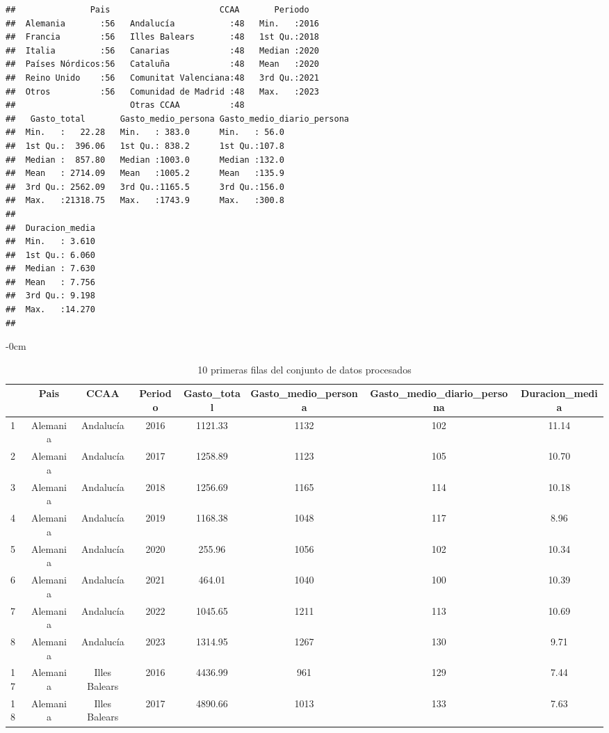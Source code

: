 \documentclass[data,article,submit,moreauthors,pdftex]{Definitions/mdpi}
\begin{document}
\begin{verbatim}
##               Pais                      CCAA       Periodo    
##  Alemania       :56   Andalucía           :48   Min.   :2016  
##  Francia        :56   Illes Balears       :48   1st Qu.:2018  
##  Italia         :56   Canarias            :48   Median :2020  
##  Países Nórdicos:56   Cataluña            :48   Mean   :2020  
##  Reino Unido    :56   Comunitat Valenciana:48   3rd Qu.:2021  
##  Otros          :56   Comunidad de Madrid :48   Max.   :2023  
##                       Otras CCAA          :48                 
##   Gasto_total       Gasto_medio_persona Gasto_medio_diario_persona
##  Min.   :   22.28   Min.   : 383.0      Min.   : 56.0             
##  1st Qu.:  396.06   1st Qu.: 838.2      1st Qu.:107.8             
##  Median :  857.80   Median :1003.0      Median :132.0             
##  Mean   : 2714.09   Mean   :1005.2      Mean   :135.9             
##  3rd Qu.: 2562.09   3rd Qu.:1165.5      3rd Qu.:156.0             
##  Max.   :21318.75   Max.   :1743.9      Max.   :300.8             
##                                                                   
##  Duracion_media  
##  Min.   : 3.610  
##  1st Qu.: 6.060  
##  Median : 7.630  
##  Mean   : 7.756  
##  3rd Qu.: 9.198  
##  Max.   :14.270  
## 
\end{verbatim}

\begin{table}[H]

\caption{\label{tab:unnamed-chunk-27} 10 primeras filas del conjunto de datos procesados}
             \begin{adjustwidth}{-\extralength}{0cm}
             \small
\begin{tabular}[t]{lccccccc}
\toprule
  & Pais & CCAA & Periodo & Gasto\_total & Gasto\_medio\_persona & Gasto\_medio\_diario\_persona & Duracion\_media\\
\midrule
1 & Alemania & Andalucía & 2016 & 1121.33 & 1132 & 102 & 11.14\\
2 & Alemania & Andalucía & 2017 & 1258.89 & 1123 & 105 & 10.70\\
3 & Alemania & Andalucía & 2018 & 1256.69 & 1165 & 114 & 10.18\\
4 & Alemania & Andalucía & 2019 & 1168.38 & 1048 & 117 & 8.96\\
5 & Alemania & Andalucía & 2020 & 255.96 & 1056 & 102 & 10.34\\
6 & Alemania & Andalucía & 2021 & 464.01 & 1040 & 100 & 10.39\\
7 & Alemania & Andalucía & 2022 & 1045.65 & 1211 & 113 & 10.69\\
8 & Alemania & Andalucía & 2023 & 1314.95 & 1267 & 130 & 9.71\\
17 & Alemania & Illes Balears & 2016 & 4436.99 & 961 & 129 & 7.44\\
18 & Alemania & Illes Balears & 2017 & 4890.66 & 1013 & 133 & 7.63\\
\bottomrule
\end{tabular}
    \end{adjustwidth}
\end{table}
\end{document}
